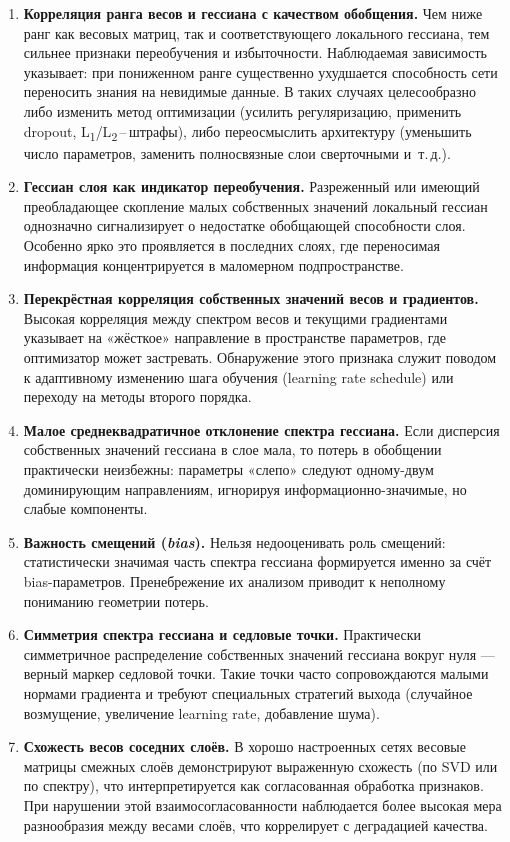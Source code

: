\documentclass[a4paper,12pt]{article}
\begin{document}
\begin{enumerate}
  \item \textbf{Корреляция ранга весов и гессиана с качеством обобщения.} Чем ниже ранг как весовых матриц,
    так и соответствующего локального гессиана, тем сильнее признаки переобучения и избыточности. Наблюдаемая
    зависимость указывает: при пониженном ранге существенно ухудшается способность сети переносить знания на
    невидимые данные. В таких случаях целесообразно либо изменить метод оптимизации (усилить регуляризацию,
    применить dropout, L\textsubscript{1}/L\textsubscript{2}\,--\,штрафы), либо переосмыслить архитектуру
    (уменьшить число параметров, заменить полносвязные слои сверточными и~т.\,д.).
  \item \textbf{Гессиан слоя как индикатор переобучения.} Разреженный или имеющий преобладающее скопление
    малых собственных значений локальный гессиан однозначно сигнализирует о недостатке обобщающей способности
    слоя. Особенно ярко это проявляется в последних слоях, где переносимая информация концентрируется в
    маломерном подпространстве.
  \item \textbf{Перекрёстная корреляция собственных значений весов и градиентов.} Высокая корреляция между
    спектром весов и текущими градиентами указывает на «жёсткое» направление в пространстве параметров, где
    оптимизатор может застревать. Обнаружение этого признака служит поводом к адаптивному изменению шага
    обучения (learning rate schedule) или переходу на методы второго порядка.
  \item \textbf{Малое среднеквадратичное отклонение спектра гессиана.} Если дисперсия собственных значений
    гессиана в слое мала, то потерь в обобщении практически неизбежны: параметры «слепо» следуют одному-двум
    доминирующим направлениям, игнорируя информационно-значимые, но слабые компоненты.
  \item \textbf{Важность смещений (\emph{bias}).} Нельзя недооценивать роль смещений: статистически значимая
    часть спектра гессиана формируется именно за счёт bias-параметров. Пренебрежение их анализом приводит к
    неполному пониманию геометрии потерь.
  \item \textbf{Симметрия спектра гессиана и седловые точки.} Практически симметричное распределение
    собственных значений гессиана вокруг нуля — верный маркер седловой точки. Такие точки часто
    сопровождаются малыми нормами градиента и требуют специальных стратегий выхода (случайное возмущение,
    увеличение learning rate, добавление шума).
  \item \textbf{Схожесть весов соседних слоёв.} В хорошо настроенных сетях весовые матрицы смежных слоёв
    демонстрируют выраженную схожесть (по SVD или по спектру), что интерпретируется как согласованная
    обработка признаков. При нарушении этой взаимосогласованности наблюдается более высокая мера разнообразия
    между весами слоёв, что коррелирует с деградацией качества.
\end{enumerate}
\end{document}

